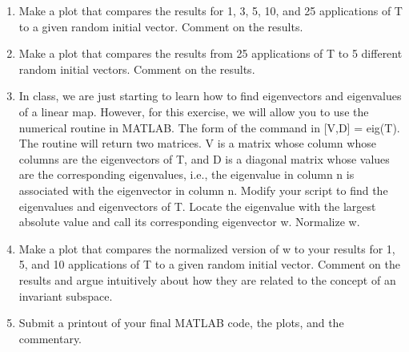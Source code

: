 \documentclass[fleqn]{article}
\begin{document}
\begin{enumerate}[nolistsep]
\begin{enumerate}
				\item Make a plot that compares the results for 1, 3, 5, 10, and 25 applications of T to a given random initial vector. Comment on the results.
				
				\item Make a plot that compares the results from 25 applications of T to 5 different random initial vectors. Comment on the results.
				
				\item In class, we are just starting to learn how to find eigenvectors and eigenvalues of a linear map. However, for this exercise, we will allow you to use the numerical routine in MATLAB. The form of the command in [V,D] = eig(T). The routine will return two matrices. V is a matrix whose column whose columns are the eigenvectors of T, and D is a diagonal matrix whose values are the corresponding eigenvalues, i.e., the eigenvalue in column n is associated with the eigenvector in column n. Modify your script to find the eigenvalues and eigenvectors of T. Locate the eigenvalue with the largest absolute value and call its corresponding eigenvector w. Normalize w.
				
				\item Make a plot that compares the normalized version of w to your results for 1, 5, and 10 applications of T to a given random initial vector. Comment on the results and argue intuitively about how they are related to the concept of an invariant subspace.
				
				\item Submit a printout of your final MATLAB code, the plots, and the commentary.
			\end{enumerate}
	\end{enumerate}
\end{document}
